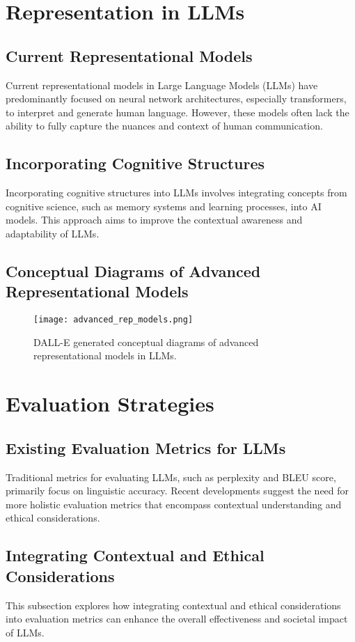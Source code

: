 \documentclass{article}
\begin{document}
\section{Representation in LLMs}
\subsection{Current Representational Models}
Current representational models in Large Language Models (LLMs) have predominantly focused on neural network architectures, especially transformers, to interpret and generate human language. However, these models often lack the ability to fully capture the nuances and context of human communication.

\subsection{Incorporating Cognitive Structures}
Incorporating cognitive structures into LLMs involves integrating concepts from cognitive science, such as memory systems and learning processes, into AI models. This approach aims to improve the contextual awareness and adaptability of LLMs.

\subsection{Conceptual Diagrams of Advanced Representational Models}
\begin{figure}[h]
\centering
\texttt{[image: advanced\_rep\_models.png]}
\caption{DALL-E generated conceptual diagrams of advanced representational models in LLMs.}
\label{fig:advanced-rep-models}
\end{figure}

\section{Evaluation Strategies}
\subsection{Existing Evaluation Metrics for LLMs}
Traditional metrics for evaluating LLMs, such as perplexity and BLEU score, primarily focus on linguistic accuracy. Recent developments suggest the need for more holistic evaluation metrics that encompass contextual understanding and ethical considerations.

\subsection{Integrating Contextual and Ethical Considerations}
This subsection explores how integrating contextual and ethical considerations into evaluation metrics can enhance the overall effectiveness and societal impact of LLMs.
\end{document}
